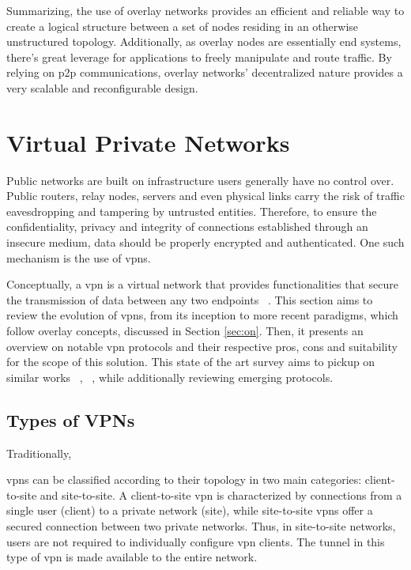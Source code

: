 \documentclass[11pt,twoside,a4paper]{report}
\begin{document}
Summarizing, the use of overlay networks provides an efficient and reliable way to create a logical structure between a set of nodes residing in an otherwise unstructured topology. Additionally, as overlay nodes are essentially end systems, there's great leverage for applications to freely manipulate and route traffic. By relying on \ac{p2p} communications, overlay networks' decentralized nature provides a very scalable and reconfigurable design.

\section{Virtual Private Networks}

Public networks are built on infrastructure users generally have no control over. Public routers, relay nodes, servers and even physical links carry the risk of traffic eavesdropping and tampering by untrusted entities. Therefore, to ensure the confidentiality, privacy and integrity of connections established through an insecure medium, data should be properly encrypted and authenticated. One such mechanism is the use of \acp{vpn}.

Conceptually, a \ac{vpn} is a virtual network that provides functionalities that secure the transmission of data between any two endpoints ~\cite{HARMENING2017843}. This section aims to review the evolution of \acp{vpn}, from its inception to more recent paradigms, which follow overlay concepts, discussed in Section \ref{sec:on}. Then, it presents an overview on notable \ac{vpn} protocols and their respective pros, cons and suitability for the scope of this solution. This state of the art survey aims to pickup on similar works ~\cite{zuqueteseguranca}, ~\cite{berger2006analysis}, while additionally reviewing emerging protocols.

\subsection{Types of VPNs}

Traditionally,

\ac{vpn}s can be classified according to their topology in two main categories: client-to-site and site-to-site. A client-to-site \ac{vpn} is characterized by connections from a single user (client) to a private network (site), while site-to-site \ac{vpn}s offer a secured connection between two private networks. Thus, in site-to-site networks, users are not required to individually configure \ac{vpn} clients. The tunnel in this type of \ac{vpn} is made available to the entire network.
\end{document}
